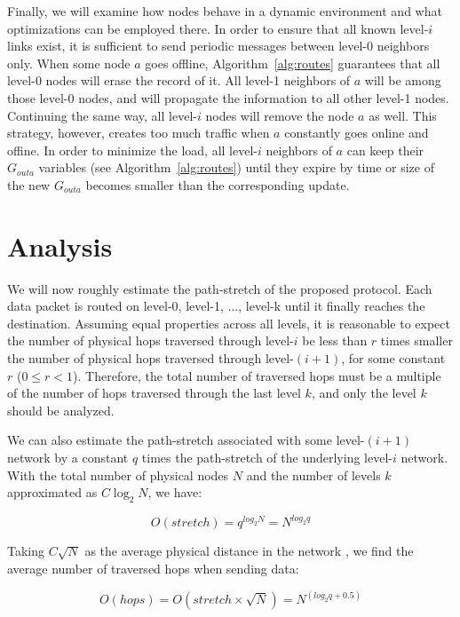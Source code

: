 \documentclass[14pt]{extarticle}
\theoremstyle{definition}
\begin{document}
Finally, we will examine how nodes behave in a dynamic environment and what optimizations can be employed there. In order to ensure that all known level-$i$ links exist, it is sufficient to send periodic messages between level-0 neighbors only. When some node $a$ goes offline, Algorithm~\ref{alg:routes} guarantees that all level-0 nodes will erase the record of it. All level-1 neighbors of $a$ will be among those level-0 nodes, and will propagate the information to all other level-1 nodes. Continuing the same way, all level-$i$ nodes will remove the node $a$ as well. This strategy, however, creates too much traffic when $a$ constantly goes online and offine. In order to minimize the load, all level-$i$ neighbors of $a$ can keep their $G_{outa}$ variables (see Algorithm~\ref{alg:routes}) until they expire by time or size of the new $G_{outa}$ becomes smaller than the corresponding update.


\section{Analysis}

We will now roughly estimate the path-stretch of the proposed protocol. Each data packet is routed on level-0, level-1, ..., level-k until it finally reaches the destination. Assuming equal properties across all levels, it is reasonable to expect the number of physical hops traversed through level-$i$ be less than $r$ times smaller the number of physical hops traversed through level-$(i+1)$, for some constant $r$ ($0 \le r < 1$). Therefore, the total number of traversed hops must be a multiple of the number of hops traversed through the last level $k$, and only the level $k$ should be analyzed.

We can also estimate the path-stretch associated with some level-$(i+1)$ network by a constant $q$ times the path-stretch of the underlying level-$i$ network. With the total number of physical nodes $N$ and the number of levels $k$ approximated as $C\log_2 N$, we have:

\begin{equation*}
    O(stretch) = q^{\displaystyle log_2 N} = N^{\displaystyle log_2 q}
\end{equation*}

Taking $C\sqrt{N}$ as the average physical distance in the network \cite{Kleinrock}, we find the average number of traversed hops when sending data:

\begin{equation*}
    O(hops) = O(stretch \times \sqrt{N}) = N^{\displaystyle (log_2 q + 0.5)}
\end{equation*}
\end{document}
